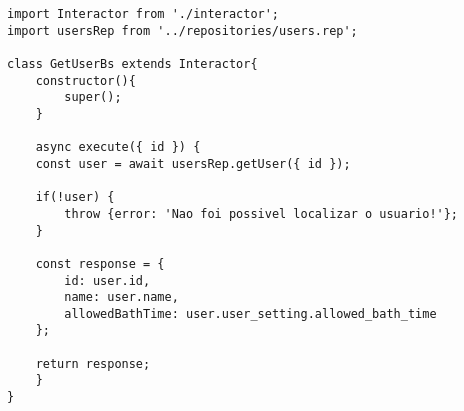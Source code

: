 \newpage

\begin{lstlisting}[caption=Exemplo do código do \textit{interactor} para recuperar informações dos usuários]
import Interactor from './interactor';
import usersRep from '../repositories/users.rep';

class GetUserBs extends Interactor{
	constructor(){
		super();
	}
	
	async execute({ id }) {
	const user = await usersRep.getUser({ id });
	
	if(!user) {
		throw {error: 'Nao foi possivel localizar o usuario!'};
	}
	
	const response = {
		id: user.id,
		name: user.name,
		allowedBathTime: user.user_setting.allowed_bath_time
	};
	
	return response;
	}
}
\end{lstlisting}

%
%
%
%
%

